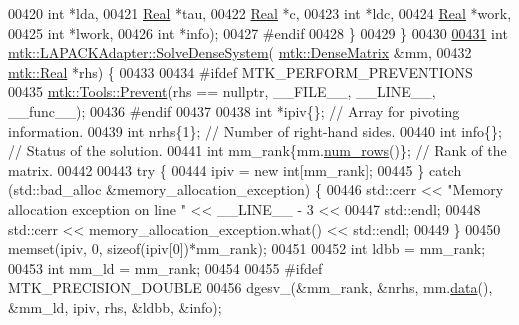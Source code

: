 \begin{DoxyCode}
00420              \textcolor{keywordtype}{int} *lda,
00421              \hyperlink{group__c01-roots_gac080bbbf5cbb5502c9f00405f894857d}{Real} *tau,
00422              \hyperlink{group__c01-roots_gac080bbbf5cbb5502c9f00405f894857d}{Real} *c,
00423              \textcolor{keywordtype}{int} *ldc,
00424              \hyperlink{group__c01-roots_gac080bbbf5cbb5502c9f00405f894857d}{Real} *work,
00425              \textcolor{keywordtype}{int} *lwork,
00426              \textcolor{keywordtype}{int} *info);
00427 \textcolor{preprocessor}{#endif}
00428 \}
00429 \}
00430 
\hypertarget{mtk__lapack__adapter_8cc_source_l00431}{}\hyperlink{classmtk_1_1LAPACKAdapter_a7428bccf74fd4a4af68fb7233846da22}{00431} \textcolor{keywordtype}{int} \hyperlink{classmtk_1_1LAPACKAdapter_a7428bccf74fd4a4af68fb7233846da22}{mtk::LAPACKAdapter::SolveDenseSystem}(
      \hyperlink{classmtk_1_1DenseMatrix}{mtk::DenseMatrix} &mm,
00432                                          \hyperlink{group__c01-roots_gac080bbbf5cbb5502c9f00405f894857d}{mtk::Real} *rhs) \{
00433 
00434 \textcolor{preprocessor}{  #ifdef MTK\_PERFORM\_PREVENTIONS}
00435   \hyperlink{classmtk_1_1Tools_a332324c6f25e66be9dff48c5987a3b9f}{mtk::Tools::Prevent}(rhs == \textcolor{keyword}{nullptr}, \_\_FILE\_\_, \_\_LINE\_\_, \_\_func\_\_);
00436 \textcolor{preprocessor}{  #endif}
00437 
00438   \textcolor{keywordtype}{int} *ipiv\{\};                \textcolor{comment}{// Array for pivoting information.}
00439   \textcolor{keywordtype}{int} nrhs\{1\};                \textcolor{comment}{// Number of right-hand sides.}
00440   \textcolor{keywordtype}{int} info\{\};                 \textcolor{comment}{// Status of the solution.}
00441   \textcolor{keywordtype}{int} mm\_rank\{mm.\hyperlink{classmtk_1_1DenseMatrix_a53f3afb3b6a8d21854458aaa9663cc74}{num\_rows}()\}; \textcolor{comment}{// Rank of the matrix.}
00442 
00443   \textcolor{keywordflow}{try} \{
00444     ipiv = \textcolor{keyword}{new} \textcolor{keywordtype}{int}[mm\_rank];
00445   \} \textcolor{keywordflow}{catch} (std::bad\_alloc &memory\_allocation\_exception) \{
00446     std::cerr << \textcolor{stringliteral}{"Memory allocation exception on line "} << \_\_LINE\_\_ - 3 <<
00447       std::endl;
00448     std::cerr << memory\_allocation\_exception.what() << std::endl;
00449   \}
00450   memset(ipiv, 0, \textcolor{keyword}{sizeof}(ipiv[0])*mm\_rank);
00451 
00452   \textcolor{keywordtype}{int} ldbb = mm\_rank;
00453   \textcolor{keywordtype}{int} mm\_ld = mm\_rank;
00454 
00455 \textcolor{preprocessor}{  #ifdef MTK\_PRECISION\_DOUBLE}
00456   dgesv\_(&mm\_rank, &nrhs, mm.\hyperlink{classmtk_1_1DenseMatrix_a0c33b8a9e01d157c61ddbdf807c25d84}{data}(), &mm\_ld, ipiv, rhs, &ldbb, &info);

\end{DoxyCode}

